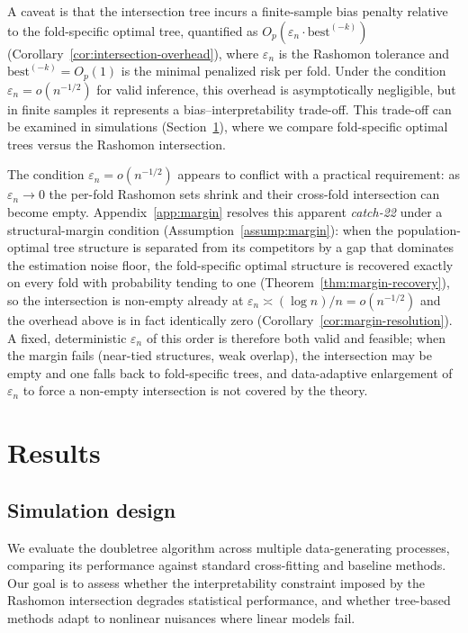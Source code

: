 \documentclass[12pt]{article}
\begin{document}
A caveat is that the intersection tree incurs a finite-sample bias penalty relative to the fold-specific optimal tree, quantified as $O_p(\varepsilon_n \cdot \text{best}^{(-k)})$ (Corollary~\ref{cor:intersection-overhead}), where $\varepsilon_n$ is the Rashomon tolerance and $\text{best}^{(-k)} = O_p(1)$ is the minimal penalized risk per fold. Under the condition $\varepsilon_n = o(n^{-1/2})$ for valid inference, this overhead is asymptotically negligible, but in finite samples it represents a bias--interpretability trade-off. This trade-off can be examined in simulations (Section~\ref{sec:results}), where we compare fold-specific optimal trees versus the Rashomon intersection.

The condition $\varepsilon_n = o(n^{-1/2})$ appears to conflict with a practical requirement: as $\varepsilon_n \to 0$ the per-fold Rashomon sets shrink and their cross-fold intersection can become empty. Appendix~\ref{app:margin} resolves this apparent \emph{catch-22} under a structural-margin condition (Assumption~\ref{assump:margin}): when the population-optimal tree structure is separated from its competitors by a gap that dominates the estimation noise floor, the fold-specific optimal structure is recovered exactly on every fold with probability tending to one (Theorem~\ref{thm:margin-recovery}), so the intersection is non-empty already at $\varepsilon_n \asymp (\log n)/n = o(n^{-1/2})$ and the overhead above is in fact identically zero (Corollary~\ref{cor:margin-resolution}). A fixed, deterministic $\varepsilon_n$ of this order is therefore both valid and feasible; when the margin fails (near-tied structures, weak overlap), the intersection may be empty and one falls back to fold-specific trees, and data-adaptive enlargement of $\varepsilon_n$ to force a non-empty intersection is not covered by the theory.

\section{Results}
\label{sec:results}

\subsection{Simulation design}

We evaluate the doubletree algorithm across multiple data-generating processes, comparing its performance against standard cross-fitting and baseline methods. Our goal is to assess whether the interpretability constraint imposed by the Rashomon intersection degrades statistical performance, and whether tree-based methods adapt to nonlinear nuisances where linear models fail.
\end{document}
